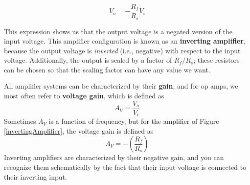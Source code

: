 $$
V_o = -\frac{R_f}{R_s}V_i
$$
\par
This expression shows us that the output voltage is a negated version of the input voltage. This amplifier configuration is known as an \textbf{inverting amplifier}, because the output voltage is \textit{inverted} (i.e., negative) with respect to the input voltage. Additionally, the output is scaled by a factor of $R_f/R_s$; these resistors can be chosen so that the scaling factor can have any value we want.
\par
All amplifier systems can be characterized by their \textbf{gain}, and for op amps, we most often refer to \textbf{voltage gain}, which is defined as 
$$
A_V = \frac{V_o}{V_i}
$$
Sometimes $A_V$ is a function of frequency, but for the amplifier of Figure \ref{invertingAmplifier}, the voltage gain is defined as
$$
A_V = -\left(\frac{R_f}{R_s}\right)
$$
Inverting amplifiers are characterized by their negative gain, and you can recognize them schematically by the fact that their input voltage is connected to their inverting input.
